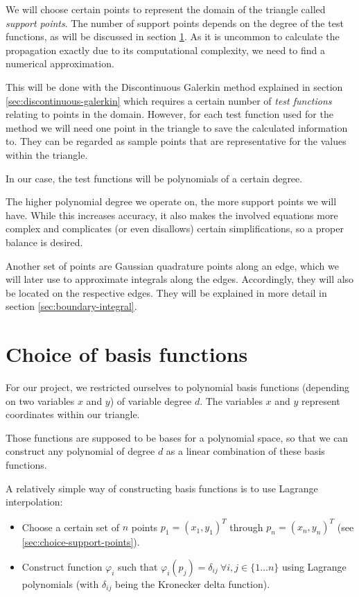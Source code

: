 \documentclass{article}
\renewcommand{\phi}{\varphi}
\begin{document}
We will choose certain points to represent the domain of the triangle called \emph{support points}. The number of support points depends on the degree of the test functions, as will be discussed in section \ref{sec:basis-functions-choice}. As it is uncommon to calculate the propagation exactly due to its computational complexity, we need to find a numerical approximation.

This will be done with the Discontinuous Galerkin method explained in section \ref{sec:discontinuous-galerkin} which requires a certain number of \emph{test functions} relating to points in the domain. However, for each test function used for the method we will need one point in the triangle to save the calculated information to. They can be regarded as sample points that are representative for the values within the triangle.

In our case, the test functions will be polynomials of a certain degree.

The higher polynomial degree we operate on, the more support points we will have. While this increases accuracy, it also makes the involved equations more complex and complicates (or even disallows) certain simplifications, so a proper balance is desired.

Another set of points are Gaussian quadrature points along an edge, which we will later use to approximate integrals along the edges.
Accordingly, they will also be located on the respective edges. They will be explained in more detail in section \ref{sec:boundary-integral}.

\section{Choice of basis functions}
\label{sec:basis-functions-choice}

For our project, we restricted ourselves to polynomial basis functions (depending on two variables $x$ and $y$) of variable degree $d$. The variables $x$ and $y$ represent coordinates within our triangle.

Those functions are supposed to be bases for a polynomial space, so that we can construct any polynomial of degree $d$ as a linear combination of these basis functions.

A relatively simple way of constructing basis functions is to use Lagrange interpolation:
\begin{itemize}
\item Choose a certain set of $n$ points $p_1=\left( x_1,y_1 \right)^T$ through $p_n=\left( x_n,y_n \right)^T$ (see \ref{sec:choice-support-points}).
\item Construct function $\phi_i$ such that $\phi_i(p_j) = \delta_{ij} \  \forall i,j \in \{1 \dots n\}$ using Lagrange polynomials (with $\delta_{ij}$ being the Kronecker delta function).
\end{itemize}
\end{document}
